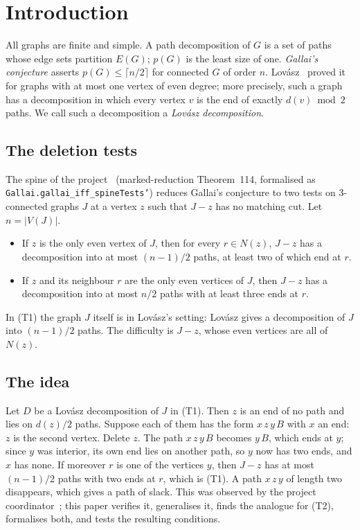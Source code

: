 \documentclass[11pt]{amsart}
\theoremstyle{definition}
\begin{document}
\section{Introduction}\label{sec:intro}

All graphs are finite and simple. A path decomposition of $G$ is a set of paths whose edge sets
partition $E(G)$; $p(G)$ is the least size of one. \emph{Gallai's conjecture} asserts
$p(G)\le\lceil n/2\rceil$ for connected $G$ of order $n$. Lov\'asz~\cite{L68} proved it for graphs
with at most one vertex of even degree; more precisely, such a graph has a decomposition in which
every vertex $v$ is the end of exactly $d(v)\bmod 2$ paths. We call such a decomposition a
\emph{Lov\'asz decomposition}.

\subsection*{The deletion tests}
The spine of the project~\cite{SP} (marked-reduction Theorem~114, formalised as
\texttt{Gallai.gallai\_iff\_spineTests'}) reduces Gallai's conjecture to two tests on
$3$-connected graphs $J$ at a vertex $z$ such that $J-z$ has no matching cut. Let $n=|V(J)|$.
\begin{itemize}[leftmargin=3.2em]
\item[(T1)] If $z$ is the only even vertex of $J$, then for every $r\in N(z)$, $J-z$ has a
decomposition into at most $(n-1)/2$ paths, at least two of which end at $r$.
\item[(T2)] If $z$ and its neighbour $r$ are the only even vertices of $J$, then $J-z$ has a
decomposition into at most $n/2$ paths with at least three ends at $r$.
\end{itemize}
In (T1) the graph $J$ itself is in Lov\'asz's setting: Lov\'asz gives a decomposition of $J$ into
$(n-1)/2$ paths. The difficulty is $J-z$, whose even vertices are all of $N(z)$.

\subsection*{The idea}
Let $D$ be a Lov\'asz decomposition of $J$ in (T1). Then $z$ is an end of no path and lies on
$d(z)/2$ paths. Suppose each of them has the form $x\,z\,y\,B$ with $x$ an end: $z$ is the second
vertex. Delete $z$. The path $x\,z\,y\,B$ becomes $y\,B$, which ends at $y$; since $y$ was interior,
its own end lies on another path, so $y$ now has two ends, and $x$ has none. If moreover $r$ is one
of the vertices $y$, then $J-z$ has at most $(n-1)/2$ paths with two ends at $r$, which is (T1).
A path $x\,z\,y$ of length two disappears, which gives a path of slack. This was observed by the
project coordinator~\cite[\S19]{SYN}; this paper verifies it, generalises it, finds the analogue
for (T2), formalises both, and tests the resulting conditions.
\end{document}
